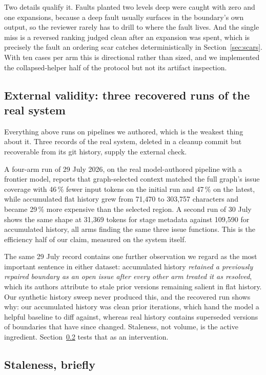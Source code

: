 Two details qualify it. Faults planted two levels deep were caught with zero and one
expansions, because a deep fault usually surfaces in the boundary's own output, so the
reviewer rarely has to drill to where the fault lives. And the single miss is a reversed
ranking judged clean after an expansion was spent, which is precisely the fault an
ordering scar catches deterministically in Section~\ref{sec:scars}. With ten cases per arm
this is directional rather than sized, and we implemented the collapsed-helper half of the
protocol but not its artifact inspection.

\subsection{External validity: three recovered runs of the real system}
\label{sec:external}

Everything above runs on pipelines we authored, which is the weakest thing about it. Three
records of the real system, deleted in a cleanup commit but recoverable from its git
history, supply the external check.

A four-arm run of 29 July 2026, on the real model-authored pipeline with a frontier model,
reports that graph-selected context matched the full graph's issue coverage with 46\,\%
fewer input tokens on the initial run and 47\,\% on the latest, while accumulated flat
history grew from 71{,}470 to 303{,}757 characters and became 29\,\% more expensive than
the selected region. A second run of 30 July shows the same shape at 31{,}369 tokens for
stage metadata against 109{,}590 for accumulated history, all arms finding the same three
issue functions. This is the efficiency half of our claim, measured on the system itself.

The same 29 July record contains one further observation we regard as the most important
sentence in either dataset: accumulated history \emph{retained a previously repaired
boundary as an open issue after every other arm treated it as resolved}, which its authors
attribute to stale prior versions remaining salient in flat history. Our synthetic history
sweep never produced this, and the recovered run shows why: our accumulated history was
clean prior iterations, which hand the model a helpful baseline to diff against, whereas
real history contains superseded versions of boundaries that have since changed. Staleness,
not volume, is the active ingredient. Section~\ref{sec:stale} tests that as an
intervention.

\subsection{Staleness, briefly}
\label{sec:stale}

